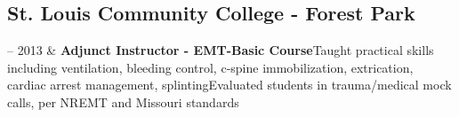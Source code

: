 \documentclass[10pt, letterpaper]{article}
\newcommand{\Duration}[2]{\fontsize{9pt}{0}\selectfont #1 -- #2}
\newcommand{\Appointment}[4]{\textbf{#1}\newline  #2\newline  #3\newline  #4}
\begin{document}
\subsection{St. Louis Community College - Forest Park}


\begin{EntriesTable}
  \Duration{2010}{2013} &
  \Appointment{Adjunct Instructor - EMT-Basic Course}
  {Taught practical skills including ventilation, bleeding control, c-spine immobilization, extrication, cardiac arrest management, splinting}
  {Evaluated students in trauma/medical mock calls, per NREMT and Missouri standards}
\end{EntriesTable}




\end{document}
